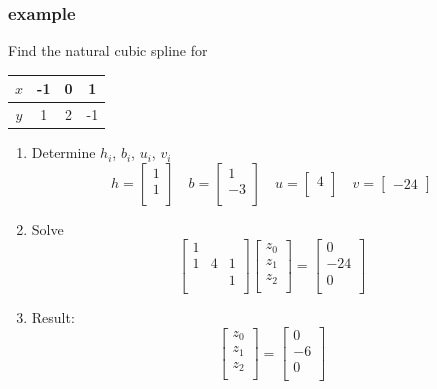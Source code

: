 \documentclass[10pt]{beamer}
\begin{document}
\begin{frame}
\frametitle{example}
Find the natural cubic spline for 
\begin{tabular}{c | c c c }
$x$ & -1 & 0 & 1\\\hline
$y$ & 1 & 2 & -1\\
\end{tabular}
\begin{enumerate}
  \item Determine $h_i$, $b_i$, $u_i$, $v_i$
    \begin{equation*}
  h=
  \begin{bmatrix}
    1\\1\\
  \end{bmatrix}\quad
  b=
  \begin{bmatrix}
    1\\-3\\
  \end{bmatrix}\quad
  u=
  \begin{bmatrix}
    4\\
  \end{bmatrix}\quad
  v=
  \begin{bmatrix}
    -24
  \end{bmatrix}
    \end{equation*}
  \item Solve
  \begin{equation*}
  \begin{bmatrix}
    1 & &\\
    1&4&1\\
    & & 1\\ 
  \end{bmatrix}
  \begin{bmatrix}
    z_0\\
    z_1\\
    z_2\\
  \end{bmatrix}
=
  \begin{bmatrix}
    0\\
    -24\\
    0\\
  \end{bmatrix}
  \end{equation*}
  \item Result:
  \begin{equation*}
  \begin{bmatrix}
    z_0\\
    z_1\\
    z_2\\
  \end{bmatrix}
=
  \begin{bmatrix}
    0\\
    -6\\
    0\\
  \end{bmatrix}
  \end{equation*}
\end{enumerate}
\end{frame}
\end{document}
